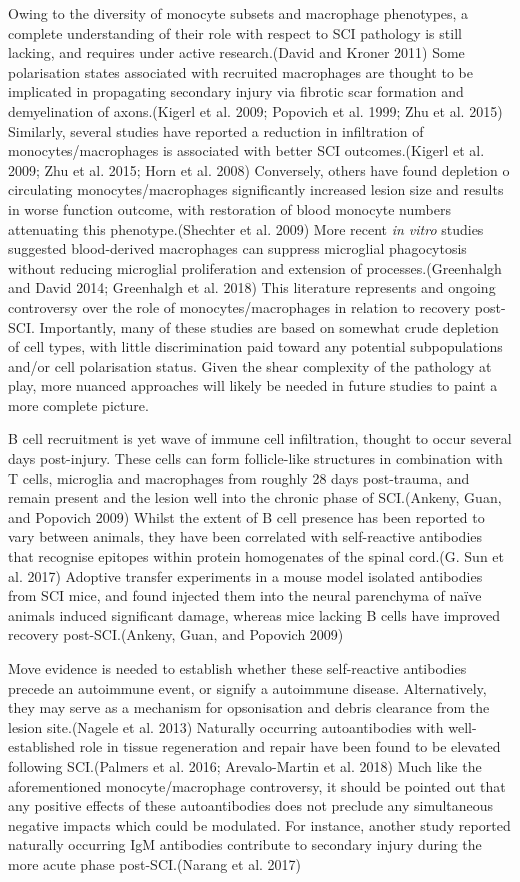 \documentclass[9pt,lineno]{elife}
\begin{document}
Owing to the diversity of monocyte subsets and macrophage phenotypes, a complete understanding of their role with respect to SCI pathology is still lacking, and requires under active research.(David and Kroner 2011)
Some polarisation states associated with recruited macrophages are thought to be implicated in propagating secondary injury via fibrotic scar formation and demyelination of axons.(Kigerl et al. 2009; Popovich et al. 1999; Zhu et al. 2015)
Similarly, several studies have reported a reduction in infiltration of monocytes/macrophages is associated with better SCI outcomes.(Kigerl et al. 2009; Zhu et al. 2015; Horn et al. 2008)
Conversely, others have found depletion o circulating monocytes/macrophages significantly increased lesion size and results in worse function outcome, with restoration of blood monocyte numbers attenuating this phenotype.(Shechter et al. 2009)
More recent \emph{in vitro} studies suggested blood-derived macrophages can suppress microglial phagocytosis without reducing microglial proliferation and extension of processes.(Greenhalgh and David 2014; Greenhalgh et al. 2018)
This literature represents and ongoing controversy over the role of monocytes/macrophages in relation to recovery post-SCI.
Importantly, many of these studies are based on somewhat crude depletion of cell types, with little discrimination paid toward any potential subpopulations and/or cell polarisation status.
Given the shear complexity of the pathology at play, more nuanced approaches will likely be needed in future studies to paint a more complete picture.

B cell recruitment is yet wave of immune cell infiltration, thought to occur several days post-injury.
These cells can form follicle-like structures in combination with T cells, microglia and macrophages from roughly 28 days post-trauma, and remain present and the lesion well into the chronic phase of SCI.(Ankeny, Guan, and Popovich 2009)
Whilst the extent of B cell presence has been reported to vary between animals, they have been correlated with self-reactive antibodies that recognise epitopes within protein homogenates of the spinal cord.(G. Sun et al. 2017)
Adoptive transfer experiments in a mouse model isolated antibodies from SCI mice, and found injected them into the neural parenchyma of naïve animals induced significant damage, whereas mice lacking B cells have improved recovery post-SCI.(Ankeny, Guan, and Popovich 2009)

Move evidence is needed to establish whether these self-reactive antibodies precede an autoimmune event, or signify a autoimmune disease.
Alternatively, they may serve as a mechanism for opsonisation and debris clearance from the lesion site.(Nagele et al. 2013)
Naturally occurring autoantibodies with well-established role in tissue regeneration and repair have been found to be elevated following SCI.(Palmers et al. 2016; Arevalo-Martin et al. 2018)
Much like the aforementioned monocyte/macrophage controversy, it should be pointed out that any positive effects of these autoantibodies does not preclude any simultaneous negative impacts which could be modulated.
For instance, another study reported naturally occurring IgM antibodies contribute to secondary injury during the more acute phase post-SCI.(Narang et al. 2017)
\end{document}

